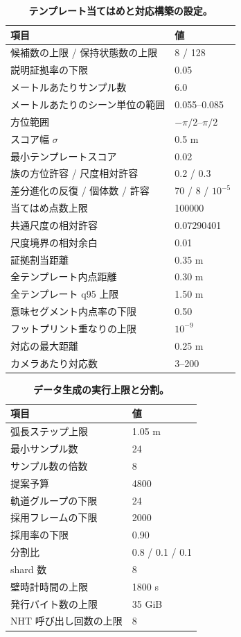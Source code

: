 \begin{table}[h]
  \centering
  \caption{\textbf{テンプレート当てはめと対応構築の設定。}}
  \label{tab:thresholds_fit}
  \small
  \begin{tabular}{@{}ll@{}}
    \toprule
    項目 & 値 \\
    \midrule
    候補数の上限 / 保持状態数の上限 & 8 / 128 \\
    説明証拠率の下限 & 0.05 \\
    メートルあたりサンプル数 & 6.0 \\
    メートルあたりのシーン単位の範囲 & 0.055--0.085 \\
    方位範囲 & \(-\pi/2\)--\(\pi/2\) \\
    スコア幅 \(\sigma\) & 0.5 m \\
    最小テンプレートスコア & 0.02 \\
    族の方位許容 / 尺度相対許容 & 0.2 / 0.3 \\
    差分進化の反復 / 個体数 / 許容 & 70 / 8 / \(10^{-5}\) \\
    当てはめ点数上限 & 100000 \\
    共通尺度の相対許容 & 0.07290401 \\
    尺度境界の相対余白 & 0.01 \\
    証拠割当距離 & 0.35 m \\
    全テンプレート内点距離 & 0.30 m \\
    全テンプレート q95 上限 & 1.50 m \\
    意味セグメント内点率の下限 & 0.50 \\
    フットプリント重なりの上限 & \(10^{-9}\) \\
    対応の最大距離 & 0.25 m \\
    カメラあたり対応数 & 3--200 \\
    \bottomrule
  \end{tabular}
\end{table}

\begin{table}[h]
  \centering
  \caption{\textbf{データ生成の実行上限と分割。}}
  \label{tab:thresholds_dataset}
  \small
  \begin{tabular}{@{}ll@{}}
    \toprule
    項目 & 値 \\
    \midrule
    弧長ステップ上限 & 1.05 m \\
    最小サンプル数 & 24 \\
    サンプル数の倍数 & 8 \\
    提案予算 & 4800 \\
    軌道グループの下限 & 24 \\
    採用フレームの下限 & 2000 \\
    採用率の下限 & 0.90 \\
    分割比 & 0.8 / 0.1 / 0.1 \\
    shard 数 & 8 \\
    壁時計時間の上限 & 1800 s \\
    発行バイト数の上限 & 35 GiB \\
    NHT 呼び出し回数の上限 & 8 \\
    \bottomrule
  \end{tabular}
\end{table}
